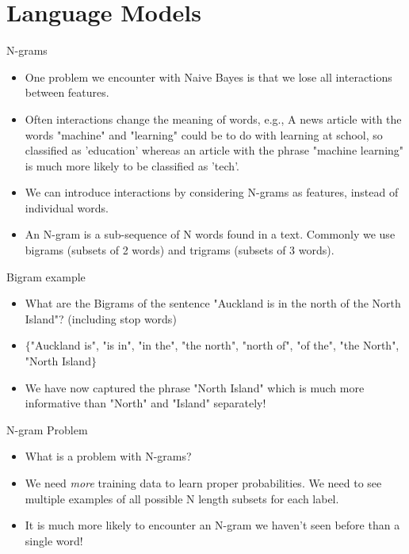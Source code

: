 \documentclass[aspectratio=169, 10pt]{beamer}
\begin{document}
\section{Language Models}
\begin{frame}{N-grams}
\begin{itemize}
    \item One problem we encounter with Naive Bayes is that we lose all interactions between features.
    \item Often interactions change the meaning of words, e.g., A news article with the words "machine" and "learning" could be to do with learning at school, so classified as 'education' whereas an article with the phrase "machine learning" is much more likely to be classified as 'tech'.
    \item We can introduce interactions by considering N-grams as features, instead of individual words.
    \item An N-gram is a sub-sequence of N words found in a text. Commonly we use bigrams (subsets of 2 words) and trigrams (subsets of 3 words).
\end{itemize}
\end{frame}

\begin{frame}{Bigram example}
\begin{itemize}
    \item What are the Bigrams of the sentence "Auckland is in the north of the North Island"? (including stop words)
    \pause
    \item $\{$"Auckland is", "is in", "in the", "the north", "north of", "of the", "the North", "North Island$\}$
    \item We have now captured the phrase "North Island" which is much more informative than "North" and "Island" separately!
\end{itemize}
\end{frame}

\begin{frame}{N-gram Problem}
\begin{itemize}
    \item What is a problem with N-grams?
    \pause
    \item We need \textit{more} training data to learn proper probabilities. We need to see multiple examples of all possible N length subsets for each label.
    \item It is much more likely to encounter an N-gram we haven't seen before than a single word!
\end{itemize}
\end{frame}
\end{document}
